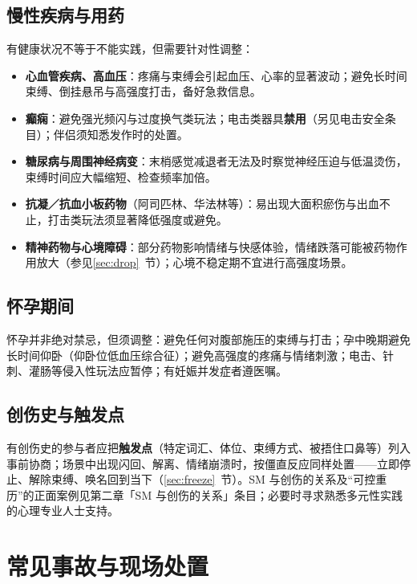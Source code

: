 \documentclass[12pt,UTF8]{ctexbook}
\begin{document}
\subsection{慢性疾病与用药}

有健康状况不等于不能实践，但需要针对性调整\citep{dunkley2019clinical}：

\begin{itemize}
\item \textbf{心血管疾病、高血压}：疼痛与束缚会引起血压、心率的显著波动；避免长时间束缚、倒挂悬吊与高强度打击，备好急救信息。
\item \textbf{癫痫}：避免强光频闪与过度换气类玩法；电击类器具\textbf{禁用}（另见电击安全条目）；伴侣须知悉发作时的处置。
\item \textbf{糖尿病与周围神经病变}：末梢感觉减退者无法及时察觉神经压迫与低温烫伤，束缚时间应大幅缩短、检查频率加倍。
\item \textbf{抗凝／抗血小板药物}（阿司匹林、华法林等）：易出现大面积瘀伤与出血不止，打击类玩法须显著降低强度或避免。
\item \textbf{精神药物与心境障碍}：部分药物影响情绪与快感体验，情绪跌落可能被药物作用放大（参见\ref{sec:drop}~节）；心境不稳定期不宜进行高强度场景。
\end{itemize}

\subsection{怀孕期间}

怀孕并非绝对禁忌，但须调整：避免任何对腹部施压的束缚与打击；孕中晚期避免长时间仰卧（仰卧位低血压综合征）；避免高强度的疼痛与情绪刺激；电击、针刺、灌肠等侵入性玩法应暂停；有妊娠并发症者遵医嘱。

\subsection{创伤史与触发点}

有创伤史的参与者应把\textbf{触发点}（特定词汇、体位、束缚方式、被捂住口鼻等）列入事前协商；场景中出现闪回、解离、情绪崩溃时，按僵直反应同样处置——立即停止、解除束缚、唤名回到当下（\ref{sec:freeze}~节）。SM 与创伤的关系及“可控重历”的正面案例见第二章「SM 与创伤的关系」条目；必要时寻求熟悉多元性实践的心理专业人士支持。


\section{常见事故与现场处置}
\end{document}
